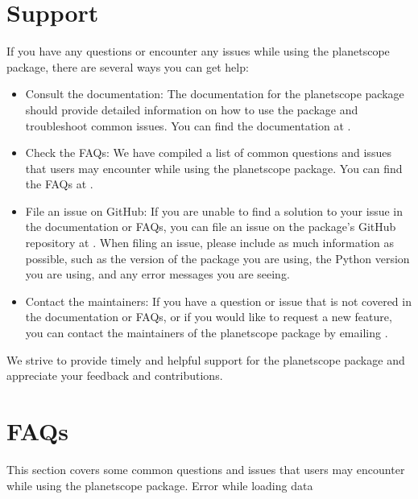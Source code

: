 \documentclass[letterpaper,10pt,english]{sphinxmanual}
\begin{document}
\chapter{Support}
\label{\detokenize{supportfaqs:support}}\label{\detokenize{supportfaqs::doc}}
\sphinxAtStartPar
If you have any questions or encounter any issues while using the planetscope package, there are several ways you can get help:
\begin{itemize}
\item {} 
\sphinxAtStartPar
Consult the documentation: The documentation for the planetscope package should provide detailed information on how to use the package and troubleshoot common issues. You can find the documentation at .

\item {} 
\sphinxAtStartPar
Check the FAQs: We have compiled a list of common questions and issues that users may encounter while using the planetscope package. You can find the FAQs at .

\item {} 
\sphinxAtStartPar
File an issue on GitHub: If you are unable to find a solution to your issue in the documentation or FAQs, you can file an issue on the package’s GitHub repository at . When filing an issue, please include as much information as possible, such as the version of the package you are using, the Python version you are using, and any error messages you are seeing.

\item {} 
\sphinxAtStartPar
Contact the maintainers: If you have a question or issue that is not covered in the documentation or FAQs, or if you would like to request a new feature, you can contact the maintainers of the planetscope package by emailing .

\end{itemize}

\sphinxAtStartPar
We strive to provide timely and helpful support for the planetscope package and appreciate your feedback and contributions.


\chapter{FAQs}
\label{\detokenize{supportfaqs:faqs}}
\sphinxAtStartPar
This section covers some common questions and issues that users may encounter while using the planetscope package.
Error while loading data
\end{document}
